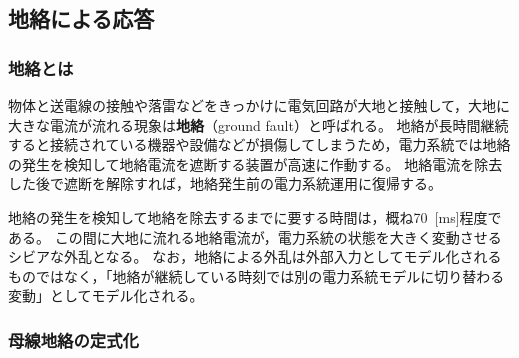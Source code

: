 \documentclass[tombow,dvipdfmx]{corona-a5-1.1}
\begin{document}
\subsection{地絡による応答}\label{sec:fault}

\smallskip
\subsubsection{地絡とは}

物体と送電線の接触や落雷などをきっかけに電気回路が大地と接触して，大地に大きな電流が流れる現象は\textbf{地絡}（ground fault）と呼ばれる。
地絡が長時間継続すると接続されている機器や設備などが損傷してしまうため，電力系統では地絡の発生を検知して地絡電流を遮断する装置が高速に作動する。
地絡電流を除去した後で遮断を解除すれば，地絡発生前の電力系統運用に復帰する。

地絡の発生を検知して地絡を除去するまでに要する時間は，概ね70~[ms]程度である。
この間に大地に流れる地絡電流が，電力系統の状態を大きく変動させるシビアな外乱となる。
なお，地絡による外乱は外部入力としてモデル化されるものではなく，「地絡が継続している時刻では別の電力系統モデルに切り替わる変動」としてモデル化される。

\smallskip
\subsubsection{母線地絡の定式化}
\end{document}
